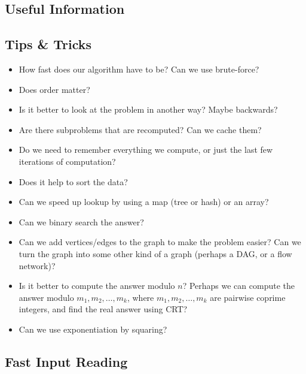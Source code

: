 \documentclass[9pt,a4paper,twocolumn,landscape,oneside]{amsart}
\newcommand{\regcode}[1]{\inputminted{cpp}{code/#1}}
\newenvironment{myitemize}
{ \begin{itemize}[leftmargin=.5cm]
    \setlength{\itemsep}{0pt}
    \setlength{\parskip}{0pt}
    \setlength{\parsep}{0pt}     }
{ \end{itemize}                  }
\newif\ifverbose
\begin{document}
\onecolumn
\begin{multicols*}{3}
\section{Useful Information}
    \subsection{Tips \&{} Tricks}
        \begin{myitemize}
            \item How fast does our algorithm have to be? Can we use
                brute-force?
            \item Does order matter?
            \item Is it better to look at the problem in another way? Maybe
                backwards?
            \item Are there subproblems that are recomputed? Can we cache them?
            \item Do we need to remember everything we compute, or just the
                last few iterations of computation?
            \item Does it help to sort the data?
            \item Can we speed up lookup by using a map (tree or hash) or an
                array?
            \item Can we binary search the answer?
            \item Can we add vertices/edges to the graph to make the problem
                easier? Can we turn the graph into some other kind of a graph
                (perhaps a DAG, or a flow network)?
            \item Is it better to compute the answer modulo $n$? Perhaps we can
                compute the answer modulo $m_1,m_2,\ldots,m_k$, where
                $m_1,m_2,\ldots,m_k$ are pairwise coprime integers, and find
                the real answer using CRT?
            \item Can we use exponentiation by squaring?
        \end{myitemize}

    \subsection{Fast Input Reading}
        \ifverbose
        If input or output is huge, sometimes it is beneficial to optimize the
        input reading/output writing. This can be achieved by reading all input
        in at once (using fread), and then parsing it manually. Output can also
        be stored in an output buffer and then dumped once in the end (using
        fwrite). A simpler, but still effective, way to achieve speed is to use
        the following input reading method.
        \fi
        \regcode{tricks/fast_input.cpp}


\end{multicols*}
\end{document}
